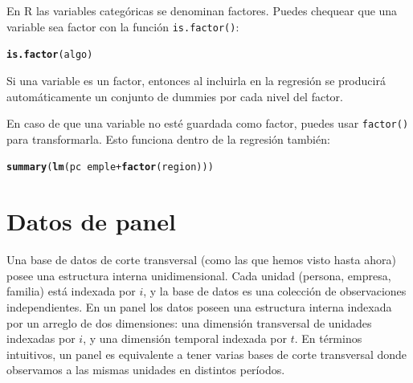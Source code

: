 \documentclass{article}\usepackage[]{graphicx}\usepackage[]{color}
\makeatletter
\newcommand{\hlopt}[1]{\textcolor[rgb]{0,0,0}{#1}}%
\newcommand{\hlstd}[1]{\textcolor[rgb]{0.345,0.345,0.345}{#1}}%
\newcommand{\hlkwd}[1]{\textcolor[rgb]{0.737,0.353,0.396}{\textbf{#1}}}%
\newenvironment{kframe}{%
 \def\at@end@of@kframe{}%
 \ifinner\ifhmode%
  \def\at@end@of@kframe{\end{minipage}}%
  \begin{minipage}{\columnwidth}%
 \fi\fi%
 \def\FrameCommand##1{\hskip\@totalleftmargin \hskip-\fboxsep
 \colorbox{shadecolor}{##1}\hskip-\fboxsep
     \hskip-\linewidth \hskip-\@totalleftmargin \hskip\columnwidth}%
 \MakeFramed {\advance\hsize-\width
   \@totalleftmargin\z@ \linewidth\hsize
   \@setminipage}}%
 {\par\unskip\endMakeFramed%
 \at@end@of@kframe}
\newenvironment{knitrout}{}{} %
\makeatother
\begin{document}
En R las variables categóricas se denominan factores. Puedes chequear que una variable sea factor con la función \verb|is.factor()|:

\begin{knitrout}
\color{fgcolor}\begin{kframe}
\begin{alltt}
\hlkwd{is.factor}\hlstd{(algo)}
\end{alltt}


{\ttfamily\noindent\bfseries\color{errorcolor}{\#\# Error in is.factor(algo): object 'algo' not found}}\end{kframe}
\end{knitrout}

Si una variable es un factor, entonces al incluirla en la regresión se producirá automáticamente un conjunto de dummies por cada nivel del factor.

En caso de que una variable no esté guardada como factor, puedes usar \verb|factor()| para transformarla. Esto funciona dentro de la regresión también:

\begin{knitrout}
\color{fgcolor}\begin{kframe}
\begin{alltt}
\hlkwd{summary}\hlstd{(}\hlkwd{lm}\hlstd{(pc} \hlopt{~} \hlstd{emple} \hlopt{+} \hlkwd{factor}\hlstd{(region)))}
\end{alltt}


{\ttfamily\noindent\bfseries\color{errorcolor}{\#\# Error in eval(predvars, data, env): object 'pc' not found}}\end{kframe}
\end{knitrout}


\section{Datos de panel}

Una base de datos de corte transversal (como las que hemos visto hasta ahora) posee una estructura interna unidimensional. Cada unidad (persona, empresa, familia) está indexada por $i$, y la base de datos es una colección de observaciones independientes.
En un panel los datos poseen una estructura interna indexada por un arreglo de dos dimensiones: una dimensión transversal de unidades indexadas por $i$, y una dimensión temporal indexada por $t$. En términos intuitivos, un panel es equivalente a tener varias bases de corte transversal donde observamos a las mismas unidades en distintos períodos.
\end{document}
